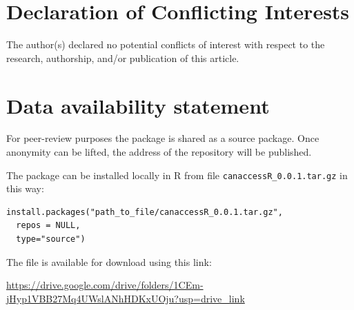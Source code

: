 \documentclass[Royal,times,sageh]{sagej}
\begin{document}
\section{Declaration of Conflicting
Interests}\label{declaration-of-conflicting-interests}

The author(s) declared no potential conflicts of interest with respect
to the research, authorship, and/or publication of this article.

\section{Data availability statement}\label{data-availability-statement}

For peer-review purposes the package is shared as a source package. Once
anonymity can be lifted, the address of the repository will be
published.

The package can be installed locally in R from file
\texttt{canaccessR\_0.0.1.tar.gz} in this way:

\begin{verbatim}
install.packages("path_to_file/canaccessR_0.0.1.tar.gz", 
  repos = NULL, 
  type="source")
\end{verbatim}

The file is available for download using this link:

\url{https://drive.google.com/drive/folders/1CEm-jHyp1VBB27Mq4UWslANhHDKxUOju?usp=drive_link}



\end{document}
